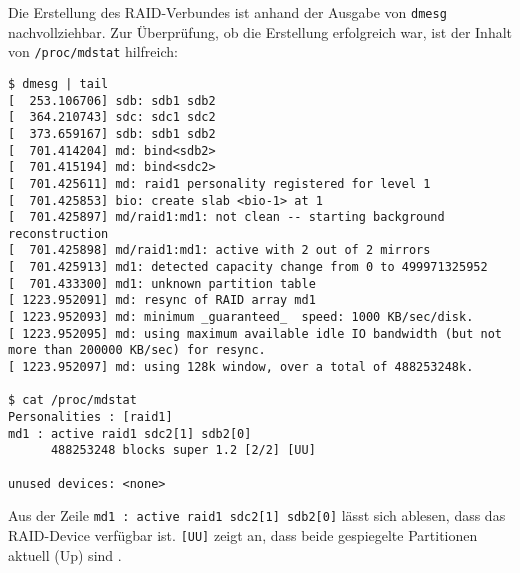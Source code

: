 Die Erstellung des RAID-Verbundes ist anhand der Ausgabe von \verb#dmesg# nachvollziehbar. Zur Überprüfung, ob die Erstellung erfolgreich war, ist der Inhalt von \verb#/proc/mdstat# hilfreich: 
\setupVerbatimOut
\begin{verbatim}
$ dmesg | tail
[  253.106706] sdb: sdb1 sdb2
[  364.210743] sdc: sdc1 sdc2
[  373.659167] sdb: sdb1 sdb2
[  701.414204] md: bind<sdb2>
[  701.415194] md: bind<sdc2>
[  701.425611] md: raid1 personality registered for level 1
[  701.425853] bio: create slab <bio-1> at 1
[  701.425897] md/raid1:md1: not clean -- starting background reconstruction
[  701.425898] md/raid1:md1: active with 2 out of 2 mirrors
[  701.425913] md1: detected capacity change from 0 to 499971325952
[  701.433300] md1: unknown partition table
[ 1223.952091] md: resync of RAID array md1
[ 1223.952093] md: minimum _guaranteed_  speed: 1000 KB/sec/disk.
[ 1223.952095] md: using maximum available idle IO bandwidth (but not more than 200000 KB/sec) for resync.
[ 1223.952097] md: using 128k window, over a total of 488253248k.

$ cat /proc/mdstat
Personalities : [raid1] 
md1 : active raid1 sdc2[1] sdb2[0]
      488253248 blocks super 1.2 [2/2] [UU]
      
unused devices: <none>
\end{verbatim}

Aus der Zeile \verb#md1 : active raid1 sdc2[1] sdb2[0]# lässt sich ablesen, dass das RAID-Device verfügbar ist. \verb#[UU]# zeigt an, dass beide gespiegelte Partitionen aktuell (Up) sind \cite{wiki_mdstat}.

